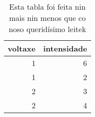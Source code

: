 \begin{table}[H]
\centering
\caption[Tabla feita con latex]{Esta tabla foi feita nin mais nin menos que co noso querid\'isimo leitek}
\label{tab:Tabla bonita}
\begin{tabular}{rr}
\toprule
voltaxe & intensidade \\
\midrule
1 & 6 \\
1 & 2 \\
2 & 3 \\
2 & 4 \\
\bottomrule
\end{tabular}
\end{table}
